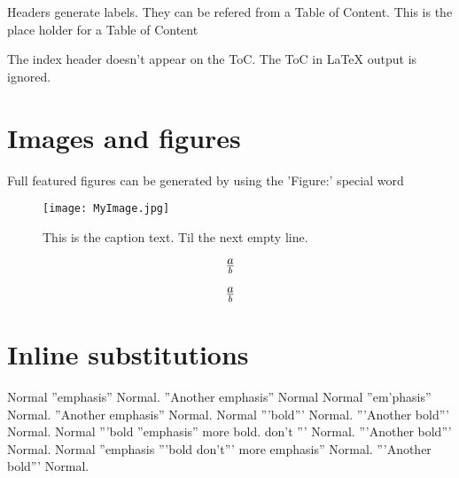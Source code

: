 Headers generate labels.
They can be refered from a Table of Content.
This is the place holder for a Table of Content


The index header doesn't appear on the ToC.
The ToC in LaTeX output is ignored.

\section{Images and figures}
\label{OtherLabel}

Full featured figures can be generated by using the 'Figure:' special word
\begin{figure*}[htbp]
\begin{center}\texttt{[image: MyImage.jpg]}\end{center}
\caption{%
This is the caption text.
Til the next empty line.
}
\label{MyLabel}
\end{figure*}


\[
a\over{b}
\]

\begin{equation}
a\over{b}
\end{equation}



\section{Inline substitutions}

Normal ''emphasis'' Normal. ''Another emphasis'' Normal
Normal ''em'phasis'' Normal. ''Another emphasis'' Normal.
Normal '''bold''' Normal. '''Another bold''' Normal.
Normal '''bold ''emphasis'' more bold. don't ''' Normal. '''Another bold''' Normal.
Normal ''emphasis '''bold don't''' more emphasis'' Normal. '''Another bold''' Normal.



